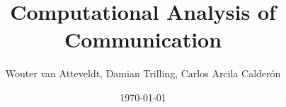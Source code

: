 \documentclass[a4paper,12pt]{book}
\begin{document}
\author{Wouter van Atteveldt, Damian Trilling, Carlos Arcila Calder\'on}
\title{Computational Analysis of Communication}
\date{\today}

\frontmatter
\maketitle
\tableofcontents

\mainmatter

\setcounter{chapter}{1}



\setcounter{chapter}{5}


\setcounter{chapter}{8}



\backmatter

\begin{small}
\printbibliography
\end{small}
\end{document}
